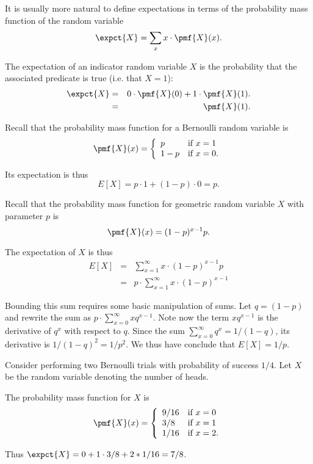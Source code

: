 \begin{flex}
\begin{gram}
It is usually more natural to define expectations in terms of the
probability mass function of the random variable
\[
\expct{X} = \sum_{x} x \cdot \pmf{X}(x).
\] 
\end{gram}
\begin{example}
The expectation of an indicator random variable $X$ is
the probability that the associated predicate is true (i.e. that
$X= 1$):
\begin{eqnarray*}
\expct{X} 
& = & 0 \cdot \pmf{X}(0) + 1 \cdot \pmf{X}(1).
\\
& = & \pmf{X}(1).
\end{eqnarray*}
\end{example}

\begin{example}
Recall that the probability mass function for a Bernoulli random
variable is  
\[
\pmf{X}(x) = 
\left\{
\begin{array}{ll}
p & \mbox{if}~x = 1
\\
1-p & \mbox{if}~x = 0.
\end{array}
\right.
\]

Its expectation is thus
\[
E[X] = p \cdot 1 + (1-p) \cdot 0 = p.
\]

\end{example}

\begin{example}
Recall that the probability mass function for geometric random
variable $X$ with parameter $p$ is 
%
\[
\pmf{X}(x) = (1-p)^{x-1} p.
\]

The expectation of $X$ is thus
\[
\begin{array}{lll}
E[X] & = & \displaystyle\sum_{x = 1}^{\infty}{x \cdot (1-p)^{x-1} p}
\\
& = &  p\cdot \displaystyle\sum_{x = 1}^{\infty}{x \cdot (1-p)^{x-1}}
\end{array}
\]

Bounding this sum requires some basic manipulation of sums.
%
Let $q = (1-p)$ and rewrite the sum as $p \cdot \sum_{x = 0}^{\infty}{xq^{x-1}}$.
%
Note now the term $xq^{x-1}$ is the derivative of $q^{x}$ with respect
to $q$.
%
Since the sum $\sum_{x=0}^{\infty}{q^x} = 1/(1-q)$, its derivative is
$1/(1-q)^2 = 1/p^2$.
%
We thus have conclude that $E[X] = 1/p$.
\end{example}

\begin{example}
Consider performing two Bernoulli trials with probability of success $1/4$.
Let $X$ be the random variable denoting the number of heads.

The probability mass function for $X$ is
\[
\pmf{X}(x) = 
\left\{
\begin{array}{ll}
9/16 & \mbox{if}~x = 0
\\
3/8 & \mbox{if}~x = 1
\\
1/16 & \mbox{if}~x = 2.
\end{array}
\right.
\]

Thus $\expct{X} = 0 + 1 \cdot 3/8 + 2 * 1/16 = 7/8$.
\end{example}

\end{flex}
